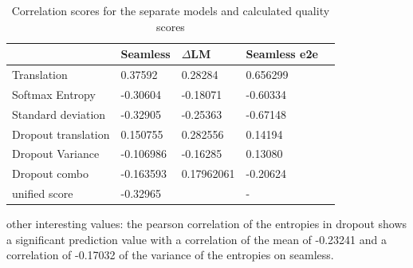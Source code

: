 \begin{table}[ht]
\begin{tabular}{l|llll}
    & Seamless & $\Delta$LM&  Seamless e2e\\ \hline
Translation & 0.37592 & 0.28284 & 0.656299\\ 
Softmax Entropy & -0.30604   &-0.18071 & -0.60334 \\
Standard deviation & -0.32905  & -0.25363& -0.67148 \\ \hline

Dropout translation & 0.150755& 0.282556& 0.14194\\

Dropout Variance &-0.106986 & -0.16285& 0.13080\\
Dropout combo & -0.163593& 0.17962061& -0.20624\\
\hline
unified score   & -0.32965 &  & - 

\end{tabular}

\caption{Correlation scores for the separate models and calculated quality scores}
\label{results}
\end{table}

other interesting values: the pearson correlation of the entropies in dropout shows a significant prediction value with a correlation of the mean of -0.23241 and a correlation of -0.17032 of the variance of the entropies on seamless.